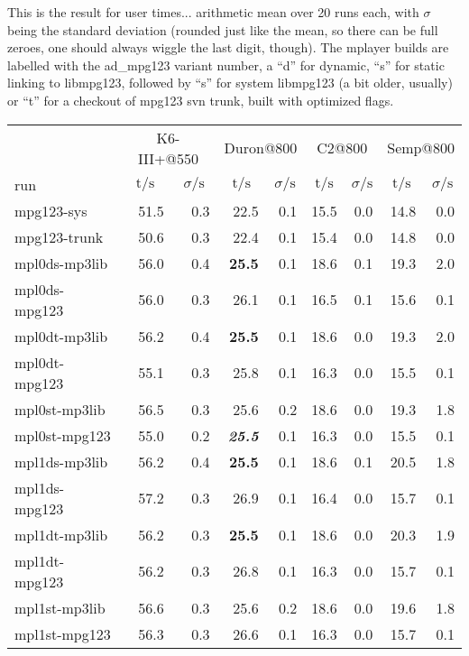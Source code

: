 \documentclass[a4paper,12pt]{scrartcl}
\newcommand{\tsigma}[0]{\multicolumn{1}{c}{$\text{t}/\text{s}$} & \multicolumn{1}{c}{$\sigma/\text{s}$}}
\begin{document}
\newpage
This is the result for user times... arithmetic mean over 20 runs each, with $\sigma$ being the standard deviation (rounded just like the mean, so there can be full zeroes, one should always wiggle the last digit, though).
The mplayer builds are labelled with the ad\_mpg123 variant number, a ``d'' for dynamic, ``s'' for static linking to libmpg123, followed by ``s'' for system libmpg123 (a bit older, usually) or ``t'' for a checkout of mpg123 svn trunk, built with optimized flags.
\begin{center}
\begin{tabular}{lrrrrrrrr}
    & \multicolumn{2}{c}{K6-III+@550} & \multicolumn{2}{c}{Duron@800} & \multicolumn{2}{c}{C2@800} & \multicolumn{2}{c}{Semp@800} \\
run & \tsigma & \tsigma & \tsigma & \tsigma \\
\midrule
\midrule
mpg123-sys    & 51.5&0.3 & 22.5&0.1               & 15.5&0.0               & 14.8&0.0 \\
mpg123-trunk  & 50.6&0.3 & 22.4&0.1               & 15.4&0.0               & 14.8&0.0 \\
\midrule
mpl0ds-mp3lib & 56.0&0.4 & \textbf{25.5}&0.1      & 18.6&0.1               & 19.3&2.0 \\
mpl0ds-mpg123 & 56.0&0.3 & 26.1&0.1               & 16.5&0.1               & 15.6&0.1 \\
mpl0dt-mp3lib & 56.2&0.4 & \textbf{25.5}&0.1      & 18.6&0.0               & 19.3&2.0 \\
mpl0dt-mpg123 & 55.1&0.3 & 25.8&0.1               & 16.3&0.0               & 15.5&0.1 \\
mpl0st-mp3lib & 56.5&0.3 & 25.6&0.2               & 18.6&0.0               & 19.3&1.8 \\
mpl0st-mpg123 & 55.0&0.2 & \textbf{\em{25.5}}&0.1 & 16.3&0.0               & 15.5&0.1 \\
\midrule
mpl1ds-mp3lib & 56.2&0.4 & \textbf{25.5}&0.1      & 18.6&0.1               & 20.5&1.8 \\
mpl1ds-mpg123 & 57.2&0.3 & 26.9&0.1               & 16.4&0.0               & 15.7&0.1 \\
mpl1dt-mp3lib & 56.2&0.3 & \textbf{25.5}&0.1      & 18.6&0.0               & 20.3&1.9 \\
mpl1dt-mpg123 & 56.2&0.3 & 26.8&0.1               & 16.3&0.0               & 15.7&0.1 \\
mpl1st-mp3lib & 56.6&0.3 & 25.6&0.2               & 18.6&0.0               & 19.6&1.8 \\
mpl1st-mpg123 & 56.3&0.3 & 26.6&0.1               & 16.3&0.0               & 15.7&0.1 \\

\end{tabular}
\end{center}
\end{document}
